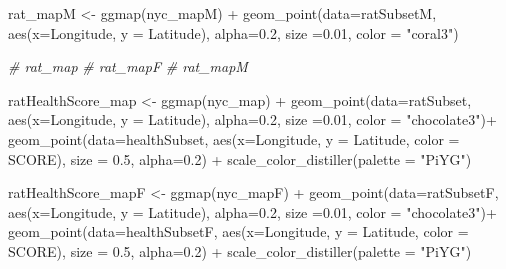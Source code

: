 \documentclass[
]{article}
\newenvironment{Shaded}{\begin{snugshade}}{\end{snugshade}}
\newcommand{\AttributeTok}[1]{\textcolor[rgb]{0.77,0.63,0.00}{#1}}
\newcommand{\CommentTok}[1]{\textcolor[rgb]{0.56,0.35,0.01}{\textit{#1}}}
\newcommand{\FloatTok}[1]{\textcolor[rgb]{0.00,0.00,0.81}{#1}}
\newcommand{\FunctionTok}[1]{\textcolor[rgb]{0.00,0.00,0.00}{#1}}
\newcommand{\NormalTok}[1]{#1}
\newcommand{\OtherTok}[1]{\textcolor[rgb]{0.56,0.35,0.01}{#1}}
\newcommand{\SpecialCharTok}[1]{\textcolor[rgb]{0.00,0.00,0.00}{#1}}
\newcommand{\StringTok}[1]{\textcolor[rgb]{0.31,0.60,0.02}{#1}}
\begin{document}
\begin{Shaded}
\begin{Highlighting}[]
\NormalTok{rat\_mapM }\OtherTok{\textless{}{-}} \FunctionTok{ggmap}\NormalTok{(nyc\_mapM) }\SpecialCharTok{+}
  \FunctionTok{geom\_point}\NormalTok{(}\AttributeTok{data=}\NormalTok{ratSubsetM, }\FunctionTok{aes}\NormalTok{(}\AttributeTok{x=}\NormalTok{Longitude, }\AttributeTok{y =}\NormalTok{ Latitude), }\AttributeTok{alpha=}\FloatTok{0.2}\NormalTok{, }\AttributeTok{size =}\FloatTok{0.01}\NormalTok{, }\AttributeTok{color =} \StringTok{"coral3"}\NormalTok{)}

\CommentTok{\# rat\_map}
\CommentTok{\# rat\_mapF}
\CommentTok{\# rat\_mapM}


\NormalTok{ratHealthScore\_map }\OtherTok{\textless{}{-}} \FunctionTok{ggmap}\NormalTok{(nyc\_map) }\SpecialCharTok{+}
  \FunctionTok{geom\_point}\NormalTok{(}\AttributeTok{data=}\NormalTok{ratSubset, }\FunctionTok{aes}\NormalTok{(}\AttributeTok{x=}\NormalTok{Longitude, }\AttributeTok{y =}\NormalTok{ Latitude), }\AttributeTok{alpha=}\FloatTok{0.2}\NormalTok{, }\AttributeTok{size =}\FloatTok{0.01}\NormalTok{, }\AttributeTok{color =} \StringTok{"chocolate3"}\NormalTok{)}\SpecialCharTok{+}
  \FunctionTok{geom\_point}\NormalTok{(}\AttributeTok{data=}\NormalTok{healthSubset, }\FunctionTok{aes}\NormalTok{(}\AttributeTok{x=}\NormalTok{Longitude, }\AttributeTok{y =}\NormalTok{ Latitude, }\AttributeTok{color =}\NormalTok{ SCORE), }\AttributeTok{size =} \FloatTok{0.5}\NormalTok{, }\AttributeTok{alpha=}\FloatTok{0.2}\NormalTok{) }\SpecialCharTok{+}
  \FunctionTok{scale\_color\_distiller}\NormalTok{(}\AttributeTok{palette =} \StringTok{"PiYG"}\NormalTok{)}

\NormalTok{ratHealthScore\_mapF }\OtherTok{\textless{}{-}} \FunctionTok{ggmap}\NormalTok{(nyc\_mapF) }\SpecialCharTok{+}
  \FunctionTok{geom\_point}\NormalTok{(}\AttributeTok{data=}\NormalTok{ratSubsetF, }\FunctionTok{aes}\NormalTok{(}\AttributeTok{x=}\NormalTok{Longitude, }\AttributeTok{y =}\NormalTok{ Latitude), }\AttributeTok{alpha=}\FloatTok{0.2}\NormalTok{, }\AttributeTok{size =}\FloatTok{0.01}\NormalTok{, }\AttributeTok{color =} \StringTok{"chocolate3"}\NormalTok{)}\SpecialCharTok{+}
  \FunctionTok{geom\_point}\NormalTok{(}\AttributeTok{data=}\NormalTok{healthSubsetF, }\FunctionTok{aes}\NormalTok{(}\AttributeTok{x=}\NormalTok{Longitude, }\AttributeTok{y =}\NormalTok{ Latitude, }\AttributeTok{color =}\NormalTok{ SCORE), }\AttributeTok{size =} \FloatTok{0.5}\NormalTok{, }\AttributeTok{alpha=}\FloatTok{0.2}\NormalTok{) }\SpecialCharTok{+}
  \FunctionTok{scale\_color\_distiller}\NormalTok{(}\AttributeTok{palette =} \StringTok{"PiYG"}\NormalTok{)}


\end{Highlighting}
\end{Shaded}
\end{document}
